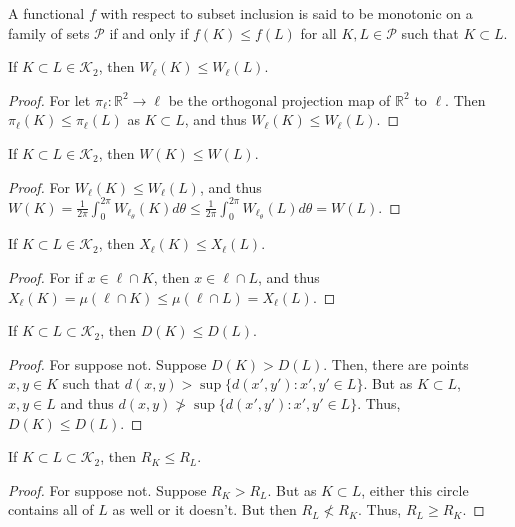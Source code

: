 \documentclass[crop=false,class=book]{standalone}
\begin{document}
\begin{definition}
A functional $f$ with respect to subset inclusion is said to be monotonic on a family of sets $\mathscr{P}$ if and only if $f(K)\leq f(L)$ for all $K,L \in \mathscr{P}$ such that $K\subset L$.
\end{definition}
\begin{theorem}
If $K\subset L \in \mathscr{K}_2$, then $W_{\ell}(K) \leq W_{\ell}(L)$.
\end{theorem}
\begin{proof}
For let $\pi_{\ell}:\mathbb{R}^2 \rightarrow \ell$ be the orthogonal projection map of $\mathbb{R}^2$ to $\ell$. Then $\pi_{\ell}(K)\leq \pi_{\ell}(L)$ as $K\subset L$, and thus $W_{\ell}(K)\leq W_{\ell}(L)$.
\end{proof}
\begin{theorem}
If $K\subset L\in \mathscr{K}_2$, then $W(K)\leq W(L)$.
\end{theorem}
\begin{proof}
For $W_{\ell}(K)\leq W_{\ell}(L)$, and thus $W(K)=\frac{1}{2\pi}\int_{0}^{2\pi}W_{\ell_{\theta}}(K)d\theta \leq \frac{1}{2\pi}\int_{0}^{2\pi}W_{\ell_{\theta}}(L)d\theta=W(L)$.
\end{proof}
\begin{theorem}
If $K\subset L\in \mathscr{K}_2$, then $X_{\ell}(K)\leq X_{\ell}(L)$.
\end{theorem}
\begin{proof}
For if $x\in \ell\cap K$, then $x\in \ell\cap L$, and thus $X_{\ell}(K)=\mu(\ell\cap K) \leq \mu(\ell\cap L)=X_{\ell}(L)$.
\end{proof}
\begin{theorem}
If $K\subset L\subset \mathscr{K}_2$, then $D(K)\leq D(L)$.
\end{theorem}
\begin{proof}
For suppose not. Suppose $D(K)>D(L)$. Then, there are points $x,y\in K$ such that $d(x,y)> \sup\{d(x',y'):x',y'\in L\}$. But as $K\subset L$, $x,y\in L$ and thus $d(x,y) \not> \sup\{d(x',y'):x',y'\in L\}$. Thus, $D(K)\leq D(L)$.
\end{proof}
\begin{theorem}
If $K\subset L \subset \mathscr{K}_2$, then $R_K\leq R_L$.
\end{theorem}
\begin{proof}
For suppose not. Suppose $R_K>R_L$. But as $K\subset L$, either this circle contains all of $L$ as well or it doesn't. But then $R_L \not<R_K$. Thus, $R_L\geq R_K$.
\end{proof}
\end{document}
